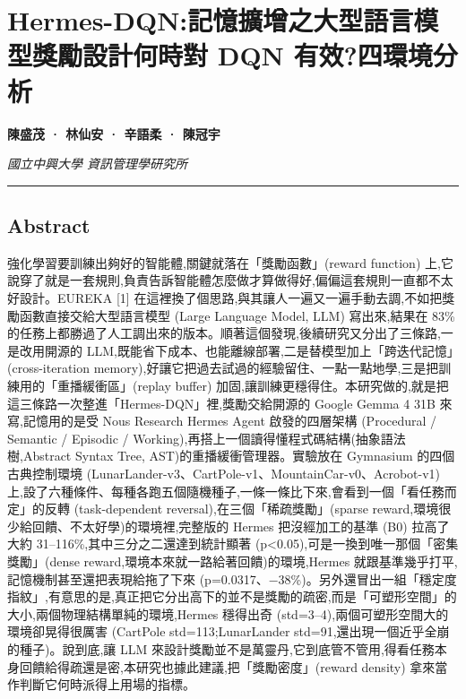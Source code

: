 \section{Hermes-DQN:記憶擴增之大型語言模型獎勵設計何時對 DQN 有效?四環境分析}\label{hermes-dqnux8a18ux61b6ux64f4ux589eux4e4bux5927ux578bux8a9eux8a00ux6a21ux578bux734eux52f5ux8a2dux8a08ux4f55ux6642ux5c0d-dqn-ux6709ux6548ux56dbux74b0ux5883ux5206ux6790}

\textbf{陳盛茂 · 林仙安 · 辛語柔 · 陳冠宇}

\emph{國立中興大學 資訊管理學研究所}

\begin{center}\rule{0.5\linewidth}{0.5pt}\end{center}

\subsection{Abstract}\label{abstract}

強化學習要訓練出夠好的智能體,關鍵就落在「獎勵函數」(reward function) 上,它說穿了就是一套規則,負責告訴智能體怎麼做才算做得好,偏偏這套規則一直都不太好設計。EUREKA {[}1{]} 在這裡換了個思路,與其讓人一遍又一遍手動去調,不如把獎勵函數直接交給大型語言模型 (Large Language Model, LLM) 寫出來,結果在 83\% 的任務上都勝過了人工調出來的版本。順著這個發現,後續研究又分出了三條路,一是改用開源的 LLM,既能省下成本、也能離線部署,二是替模型加上「跨迭代記憶」(cross-iteration memory),好讓它把過去試過的經驗留住、一點一點地學,三是把訓練用的「重播緩衝區」(replay buffer) 加固,讓訓練更穩得住。本研究做的,就是把這三條路一次整進「Hermes-DQN」裡,獎勵交給開源的 Google Gemma 4 31B 來寫,記憶用的是受 Nous Research Hermes Agent 啟發的四層架構 (Procedural / Semantic / Episodic / Working),再搭上一個讀得懂程式碼結構(抽象語法樹,Abstract Syntax Tree, AST)的重播緩衝管理器。實驗放在 Gymnasium 的四個古典控制環境 (LunarLander-v3、CartPole-v1、MountainCar-v0、Acrobot-v1) 上,設了六種條件、每種各跑五個隨機種子,一條一條比下來,會看到一個「看任務而定」的反轉 (task-dependent reversal),在三個「稀疏獎勵」(sparse reward,環境很少給回饋、不太好學)的環境裡,完整版的 Hermes 把沒經加工的基準 (B0) 拉高了大約 31--116\%,其中三分之二還達到統計顯著 (p\textless0.05),可是一換到唯一那個「密集獎勵」(dense reward,環境本來就一路給著回饋)的環境,Hermes 就跟基準幾乎打平,記憶機制甚至還把表現給拖了下來 (p=0.0317、−38\%)。另外還冒出一組「穩定度指紋」,有意思的是,真正把它分出高下的並不是獎勵的疏密,而是「可塑形空間」的大小,兩個物理結構單純的環境,Hermes 穩得出奇 (std=3--4),兩個可塑形空間大的環境卻晃得很厲害 (CartPole std=113;LunarLander std=91,還出現一個近乎全崩的種子)。說到底,讓 LLM 來設計獎勵並不是萬靈丹,它到底管不管用,得看任務本身回饋給得疏還是密,本研究也據此建議,把「獎勵密度」(reward density) 拿來當作判斷它何時派得上用場的指標。

